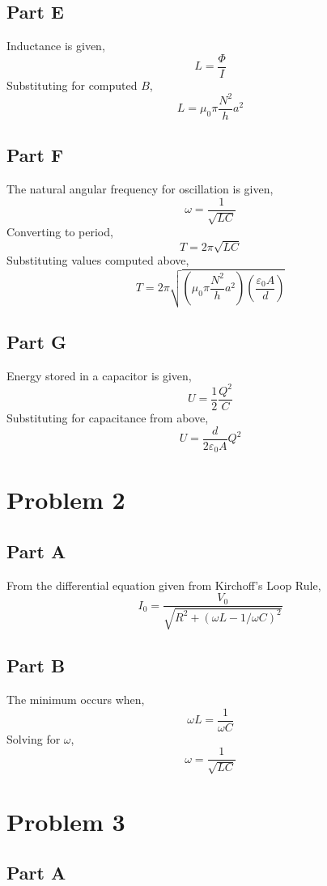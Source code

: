 \documentclass{article}
\begin{document}
\subsection*{Part E}

Inductance is given,
$$ L = \frac{\Phi}{I} $$
Substituting for computed $B$,
$$ L = \mu_0 \pi \frac{N^2}{h} a^2 $$

\subsection*{Part F}

The natural angular frequency for oscillation is given,
$$ \omega = \frac{1}{\sqrt{LC}} $$
Converting to period,
$$ T = 2 \pi \sqrt{LC} $$
Substituting values computed above,
$$ T = 2 \pi \sqrt{\left( \mu_0 \pi \frac{N^2}{h} a^2 \right) \left(
\frac{\varepsilon_0 A}{d} \right)} $$

\subsection*{Part G}

Energy stored in a capacitor is given,
$$ U = \frac{1}{2} \frac{Q^2}{C} $$
Substituting for capacitance from above,
$$ U = \frac{d}{2 \varepsilon_0 A} Q^2 $$

\section*{Problem 2}

\subsection*{Part A}

From the differential equation given from Kirchoff's Loop Rule,
$$ I_0 = \frac{V_0}{\sqrt{R^2 + (\omega L - 1/\omega C)^2}} $$

\subsection*{Part B}

The minimum occurs when,
$$ \omega L = \frac{1}{\omega C} $$
Solving for $\omega$,
$$ \omega = \frac{1}{\sqrt{LC}} $$

\section*{Problem 3}

\subsection*{Part A}
\end{document}
